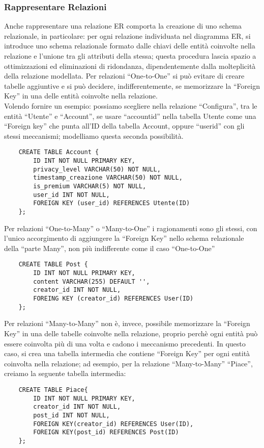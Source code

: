 \documentclass[a4paper,12pt]{report}
\begin{document}
\subsubsection{Rappresentare Relazioni}
Anche rappresentare una relazione ER comporta la creazione di uno schema relazionale, in particolare: per ogni relazione individuata nel diagramma ER, si introduce uno schema relazionale formato dalle chiavi delle entità coinvolte nella relazione e l’unione tra gli attributi della stessa; questa procedura lascia spazio a ottimizzazioni ed eliminazioni di ridondanza, dipendentemente dalla molteplicità della relazione modellata.
Per relazioni “One-to-One” si può evitare di creare tabelle aggiuntive e si può decidere, indifferentemente, se memorizzare la “Foreign Key” in una delle entità coinvolte nella relazione.
\\[0ex]
Volendo fornire un esempio: possiamo scegliere nella relazione “Configura”, tra le entità “Utente” e “Account”, se usare “account\textunderscore id” nella tabella Utente come una “Foreign key” che punta all’ID della tabella Account, oppure “user\textunderscore id” con gli stessi meccanismi; modelliamo questa seconda possibilità.
\begin{verbatim}
    CREATE TABLE Account {
        ID INT NOT NULL PRIMARY KEY,
        privacy_level VARCHAR(50) NOT NULL,
        timestamp_creazione VARCHAR(50) NOT NULL,
        is_premium VARCHAR(5) NOT NULL,
        user_id INT NOT NULL,
        FOREIGN KEY (user_id) REFERENCES Utente(ID)
    };
\end{verbatim}
\noindent
Per relazioni “One-to-Many” o “Many-to-One” i ragionamenti sono gli stessi, con l’unico accorgimento di aggiungere la “Foreign Key” nello schema relazionale della “parte Many”, non più indifferente come il caso “One-to-One”
\begin{verbatim}
    CREATE TABLE Post {
        ID INT NOT NULL PRIMARY KEY,
        content VARCHAR(255) DEFAULT '',
        creator_id INT NOT NULL,
        FOREING KEY (creator_id) REFERENCES User(ID)
    };
\end{verbatim}
Per relazioni “Many-to-Many” non è, invece, possibile memorizzare la “Foreign Key” in una delle tabelle coinvolte nella relazione, proprio perchè ogni entità può essere coinvolta più di una volta e cadono i meccanismo precedenti. In questo caso, si crea una tabella intermedia che contiene “Foreign Key” per ogni entità coinvolta nella relazione; ad esempio, per la relazione “Many-to-Many” “Piace”, creiamo la seguente tabella intermedia:
\begin{verbatim}
    CREATE TABLE Piace{
        ID INT NOT NULL PRIMARY KEY,
        creator_id INT NOT NULL,
        post_id INT NOT NULL,
        FOREIGN KEY(creator_id) REFERENCES User(ID),
        FOREIGN KEY(post_id) REFERENCES Post(ID)
    };
\end{verbatim}
\end{document}
